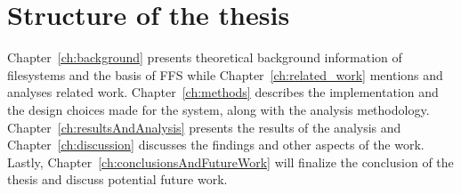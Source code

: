 \section{Structure of the thesis} %
Chapter~\ref{ch:background} presents theoretical background information of filesystems and the basis of FFS while Chapter~\ref{ch:related_work} mentions and analyses related work. Chapter~\ref{ch:methods} describes the implementation and the design choices made for the system, along with the analysis methodology. Chapter~\ref{ch:resultsAndAnalysis} presents the results of the analysis and Chapter~\ref{ch:discussion} discusses the findings and other aspects of the work. Lastly, Chapter~\ref{ch:conclusionsAndFutureWork} will finalize the conclusion of the thesis and discuss potential future work.
